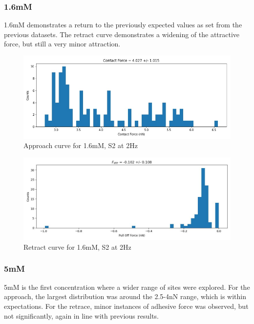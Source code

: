 \newpage

\subsubsection*{1.6mM}
1.6mM demonstrates a return to the previously expected values as set from the previous datasets. The retract curve demonstrates a widening of the attractive force, but still a very minor attraction.
\begin{figure}[h!]
\centering
\includegraphics[width=.9\textwidth]{chapter7/Tip speed/1.6mM/S1 2Hz/approach_f_c_hist.jpg}
\caption{Approach curve for 1.6mM, S2 at 2Hz}
\end{figure}

\begin{figure}[h!]
\centering
\includegraphics[width=.9\textwidth]{chapter7/Tip speed/1.6mM/S1 2Hz/retract_f_a_hist.jpg}
\caption{Retract curve for 1.6mM, S2 at 2Hz}
\end{figure}

\newpage

\subsubsection*{5mM}
5mM is the first concentration where a wider range of sites were explored. For the approach, the largest distribution was around the 2.5-4nN range, which is within expectations. For the retrace, minor instances of adhesive force was observed, but not significantly, again in line with previous results.

